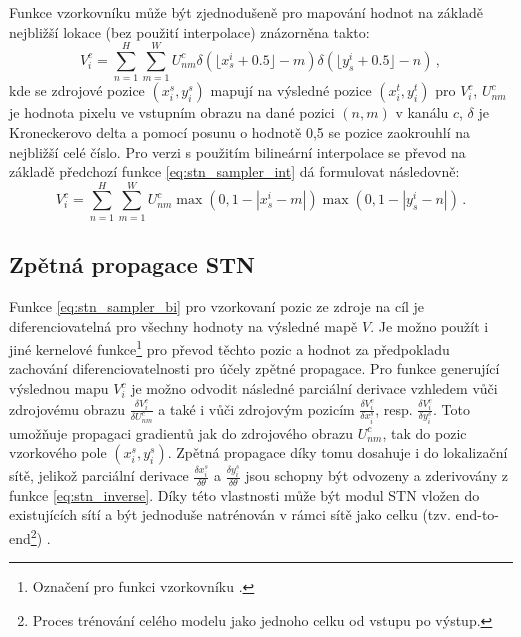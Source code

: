Funkce vzorkovníku může být zjednodušeně pro mapování hodnot na základě nejbližší lokace (bez použití interpolace) znázorněna takto:
\begin{equation}
    V_i^c = \sum_{n=1}^{H} \sum_{m=1}^{W} U_{nm}^c \delta(\lfloor x_s^i + 0.5 \rfloor - m) \delta(\lfloor y_s^i + 0.5 \rfloor - n)\,,
\label{eq:stn_sampler_int}
\end{equation}
kde se zdrojové pozice $(x_i^s, y_i^s)$ mapují na výsledné pozice $(x_i^t, y_i^t)$ pro $V_i^c$, $U_{nm}^c$ je hodnota pixelu ve vstupním obrazu na dané pozici $(n, m)$ v kanálu $c$, $\delta$ je Kroneckerovo delta a pomocí posunu o hodnotě 0,5 se pozice zaokrouhlí na nejbližší celé číslo. Pro verzi s použitím bilineární interpolace se převod na základě předchozí funkce \ref{eq:stn_sampler_int} dá formulovat následovně:
\begin{equation}
    V_i^c = \sum_{n=1}^{H} \sum_{m=1}^{W} U_{nm}^c \max(0, 1 - |x_s^i - m|) \max(0, 1 - |y_s^i - n|)\,.
\label{eq:stn_sampler_bi}
\end{equation}

\subsection{Zpětná propagace STN}

Funkce \ref{eq:stn_sampler_bi} pro vzorkovaní pozic ze zdroje na cíl je diferenciovatelná pro všechny hodnoty na výsledné mapě $V$. Je možno použít i jiné kernelové funkce\footnote{Označení pro funkci vzorkovníku \cite{stn}.} pro převod těchto pozic a hodnot za předpokladu zachování diferenciovatelnosti pro účely zpětné propagace. Pro funkce generující výslednou mapu $V_i^c$ je možno odvodit následné parciální derivace vzhledem vůči zdrojovému obrazu $\frac{\delta V_i^c}{\delta U_{nm}^c}$ a také i vůči zdrojovým pozicím $\frac{\delta V_i^c}{\delta x_i^s}$, resp. $\frac{\delta V_i^c}{\delta y_i^s}$. Toto umožňuje propagaci gradientů jak do zdrojového obrazu $U_{nm}^c$, tak do pozic vzorkového pole $(x_i^s, y_i^s)$. Zpětná propagace díky tomu dosahuje i do lokalizační sítě, jelikož parciální derivace $\frac{\delta x_i^s}{\delta \theta}$ a $\frac{\delta y_i^s}{\delta \theta}$ jsou schopny být odvozeny a zderivovány z funkce \ref{eq:stn_inverse}. Díky této vlastnosti může být modul STN vložen do existujících sítí a být jednoduše natrénován v rámci sítě jako celku (tzv. end-to-end\footnote{Proces trénování celého modelu jako jednoho celku od vstupu po výstup.}) \cite{stn}. 
\endinput